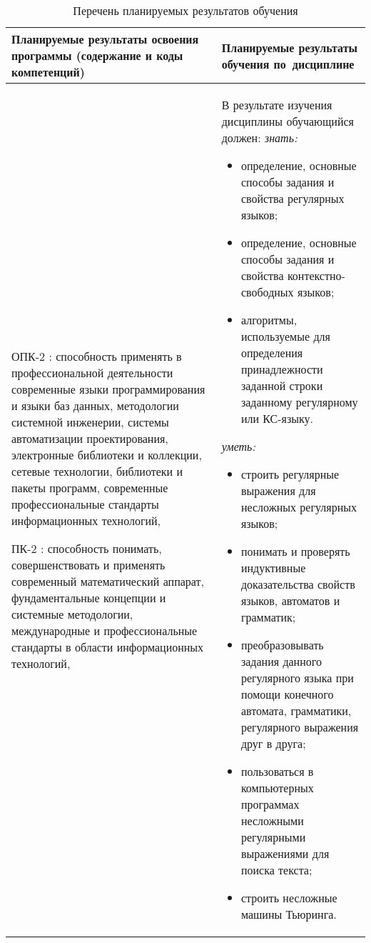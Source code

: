 \documentclass[a4paper,12pt]{article}
\begin{document}
\begin{longtable}{|p{54mm}|p{100mm}|}
  \caption{Перечень планируемых результатов обучения}\\
  \hline
  \centering
  Планируемые результаты освоения программы (содержание и коды компетенций) & 
  \centering\arraybackslash
  Планируемые результаты обучения по~дисциплине
  \\
  \hline
  
  ОПК-2 : способность применять в профессиональной деятельности современные языки программирования и языки баз данных, методологии системной инженерии, системы автоматизации проектирования, электронные библиотеки и коллекции, сетевые технологии, библиотеки и пакеты программ, современные профессиональные стандарты информационных технологий, \par 
  
  ПК-2 : способность понимать, совершенствовать и применять современный математический аппарат, фундаментальные концепции и системные методологии, международные и профессиональные стандарты в области информационных технологий, \par 
  & 
  В результате изучения дисциплины обучающийся должен:\newline
  \emph{знать:}
  \begin{itemize}[leftmargin=12pt]
    \item определение, основные способы задания и свойства регулярных языков; 
    \item определение, основные способы задания и свойства контекстно-свободных языков; 
    \item алгоритмы, используемые для определения принадлежности заданной строки заданному регулярному или КС-языку. 
  \end{itemize}
  

  \emph{уметь:}
  \begin{itemize}[leftmargin=12pt]
    \item строить регулярные выражения для несложных регулярных языков; 
    \item понимать и проверять индуктивные доказательства свойств языков, автоматов и грамматик; 
    \item преобразовывать задания данного регулярного языка при помощи конечного автомата, грамматики, регулярного выражения друг в друга; 
    \item пользоваться в компьютерных программах несложными регулярными выражениями для поиска текста; 
    \item строить несложные машины Тьюринга. 
  \end{itemize}
  

\end{longtable}
\end{document}
